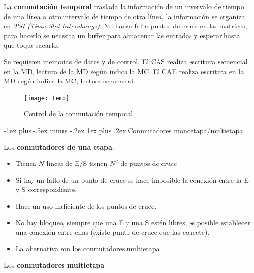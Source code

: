 \documentclass[10pt,portrait, twocolumn]{article}
\makeatletter
\renewcommand{\subsubsection}{\@startsection{subsubsection}{3}{0mm}%
                                {-1ex plus -.5ex minus -.2ex}%
                                {1ex plus .2ex}%
                                {\normalfont\small\bfseries}}
\makeatother
\begin{document}
La \textbf{conmutación temporal} traslada la información de un invervalo de tiempo de una línea a otro intervalo de tiempo de otra línea, la información se organiza en \textit{TSI (\textit{Time Slot Interchange})}. No hacen falta puntos de cruce en las matrices, para hacerlo se necesita un buffer para almacenar las entradas y esperar hasta que toque sacarlo.

\quad Se requieren memorias de datos y de control. El CAS realiza escritura secuencial en la MD, lectura de la MD según indica la MC. El CAE realiza escritura en la MD según indica la MC, lectura secuencial.

\begin{figure}[h]
	\centering
     \texttt{[image: Temp]}
      \caption{Control de la conmutación temporal}
      \label{fig:Matriz}
\end{figure}

\subsubsection{Conmutadores monoetapa/multietapa}

Los \textbf{conmutadores de una etapa}:

\begin{itemize}
\item Tienen $N$ líneas de E/S tienen $N^{2}$ de puntos de cruce
\item Si hay un fallo de un punto de cruce se hace imposible la conexión entre la E y S correspondiente.
\item Hace un uso ineficiente de los puntos de cruce.
\item  No hay bloqueo, siempre que una E y una S estén libres, es posible establecer una conexión entre ellas (existe punto de cruce que las conecte).
\item La alternativa son los conmutadores multietapa.
\end{itemize}



\quad Los \textbf{conmutadores multietapa} 
\end{document}
